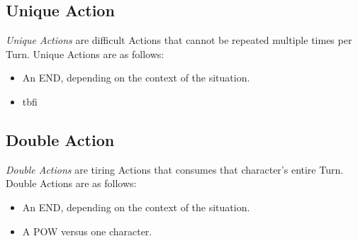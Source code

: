 \subsection{Unique Action}\label{subsec:act_unique} 
\emph{Unique Actions} are difficult Actions that cannot be repeated multiple times per Turn. Unique Actions are as follows:
\begin{itemize}
	\item An END, depending on the context of the situation.
	\item tbfi
\end{itemize} 
\subsection{Double Action}\label{subsec:act_double} 
\emph{Double Actions} are tiring Actions that consumes that character's entire Turn. Double Actions are as follows:
\begin{itemize}
	\item An END, depending on the context of the situation.
	\item A POW versus one character.
\end{itemize}